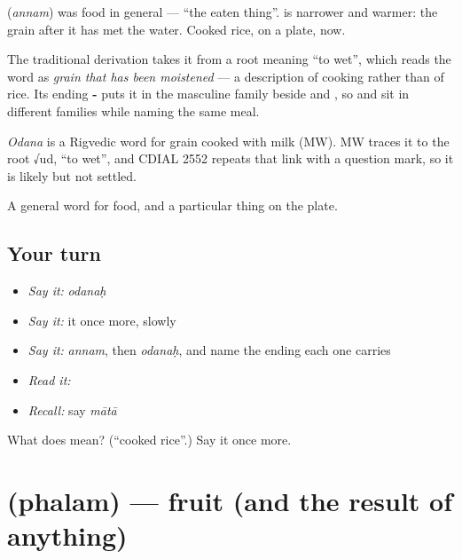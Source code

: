 \textbf{} (\emph{annam}) was food in general — \textquotedblleft{}the eaten thing\textquotedblright{}. \textbf{} is narrower and warmer: the grain after it has met the water. Cooked rice, on a plate, now.

The traditional derivation takes it from a root meaning \textquotedblleft{}to wet\textquotedblright{}, which reads the word as \emph{grain that has been moistened} — a description of cooking rather than of rice. Its ending \textbf{-} puts it in the masculine family beside  and , so  and  sit in different families while naming the same meal.

\begin{cousinweb}
\emph{Odana} is a Rigvedic word for grain cooked with milk (MW). MW traces it to the root √ud, \textquotedblleft{}to wet\textquotedblright{}, and CDIAL 2552 repeats that link with a question mark, so it is likely but not settled.
\end{cousinweb}

\begin{grammarlens}[title={What you've built}]
A general word for food, and a particular thing on the plate.
\end{grammarlens}

\subsection*{Your turn}
\begin{itemize}
\raggedright
  \item \emph{Say it:} \emph{odanaḥ}
  \item \emph{Say it:} it once more, slowly
  \item \emph{Say it:} \emph{annam}, then \emph{odanaḥ}, and name the ending each one carries
  \item \emph{Read it:} \textbf{}
  \item \emph{Recall:} say \emph{mātā}
\end{itemize}

\begin{tcolorbox}[breakable,colback=teal!4,colframe=teal!35!black,title={Before you move on}]
What does  mean? (\textquotedblleft{}cooked rice\textquotedblright{}.) Say it once more.
\end{tcolorbox}
\section[\texorpdfstring{\sk{फलम्} (phalam)}{फलम् (phalam)}]{ (phalam) — fruit (and the result of anything)}


